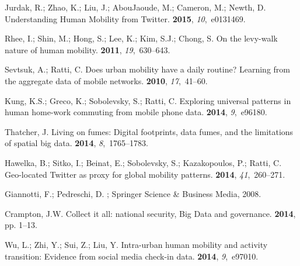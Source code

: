 \documentclass[ijgi,article,accept,moreauthors,pdftex,10pt,a4paper]{mdpi}
\theoremstyle{mdpi}
\newcounter{ex}
\newcounter{re}
\theoremstyle{mdpidefinition}
\begin{document}
\begin{thebibliography}{-------}
Jurdak, R.; Zhao, K.; Liu, J.; AbouJaoude, M.; Cameron, M.; Newth, D.
\newblock Understanding Human Mobility from Twitter.
 {\bf 2015}, {\em 10},~e0131469.

Rhee, I.; Shin, M.; Hong, S.; Lee, K.; Kim, S.J.; Chong, S.
\newblock On the levy-walk nature of human mobility.
 {\bf 2011}, {\em
  19},~630--643.

Sevtsuk, A.; Ratti, C.
\newblock Does urban mobility have a daily routine? Learning from the aggregate
  data of mobile networks.
 {\bf 2010}, {\em 17},~41--60.

Kung, K.S.; Greco, K.; Sobolevsky, S.; Ratti, C.
\newblock Exploring universal patterns in human home-work commuting from mobile
  phone data.
 {\bf 2014}, {\em 9},~e96180.

Thatcher, J.
\newblock Living on fumes: Digital footprints, data fumes, and the limitations
  of spatial big data.
 {\bf 2014}, {\em
  8},~1765--1783.

Hawelka, B.; Sitko, I.; Beinat, E.; Sobolevsky, S.; Kazakopoulos, P.; Ratti, C.
\newblock Geo-located Twitter as proxy for global mobility patterns.
 {\bf 2014}, {\em
  41},~260--271.

Giannotti, F.; Pedreschi, D.
; Springer Science \& Business Media,  2008.

Crampton, J.W.
\newblock Collect it all: national security, Big Data and governance.
 {\bf 2014}, pp. 1--13.

Wu, L.; Zhi, Y.; Sui, Z.; Liu, Y.
\newblock Intra-urban human mobility and activity transition: Evidence from
  social media check-in data.
 {\bf 2014}, {\em 9},~e97010.


\end{thebibliography}
\end{document}
